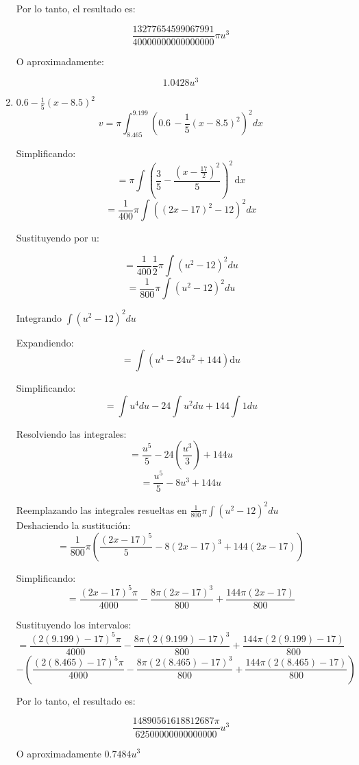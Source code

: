 \documentclass{article}
\begin{document}
\begin{enumerate}
    Por lo tanto, el resultado es:
    
    $$\dfrac{13277654599067991}{40000000000000000} \pi u^3 $$
    
    O aproximadamente:
    
    $$ 1.0428 u^3 $$
    
    
    \pagebreak

    
    \item $0.6 -\frac{1}{5} (x-8.5)^2$
    $$ v = \pi \int_{8.465}^{9.199} (0.6\, -\frac{1}{5} (x-8.5)^2)^2 dx $$
    
    Simplificando:
    $$ = \pi {\displaystyle\int}\left(\dfrac{3}{5}-\dfrac{\left(x-\frac{17}{2}\right)^2}{5}\right)^2\,\mathrm{d}x$$
    $$ = \frac{1}{400} \pi \int ((2x - 17)^2 - 12)^2 dx $$

    Sustituyendo por u:
    
    $$ = \frac{1}{400} \frac{1}{2} \pi \int (u^2 - 12)^2 du $$
    $$ = \frac{1}{800} \pi \int (u^2 - 12)^2 du $$
    
    Integrando $ \int (u^2 - 12)^2 du $
    
    Expandiendo:
    $$={\displaystyle\int}\left(u^4-24u^2+144\right)\mathrm{d}u$$
    
    Simplificando:
    $$ = \int u^4 du - 24 \int u^2 du + 144 \int 1 du $$
    
    Resolviendo las integrales:
    $$ = \frac{u^5}{5} - 24 (\frac{u^3}{3}) + 144u $$
    $$ = \frac{u^5}{5} - 8u^3 + 144u $$
    
    Reemplazando las integrales resueltas en $\frac{1}{800} \pi \int (u^2 - 12)^2 du $\\
    
    Deshaciendo la sustitución:
    $$ = \frac{1}{800} \pi (\frac{(2x-17)^5}{5} - 8(2x-17)^3 + 144(2x-17)) $$
    
    Simplificando:
    $$ = \frac{(2x-17)^5 \pi}{4000} - \frac{8\pi(2x-17)^3}{800} + \frac{144\pi(2x-17)}{800} $$
    
    Sustituyendo los intervalos:
    $$ = \frac{(2(9.199)-17)^5 \pi}{4000} - \frac{8\pi(2(9.199)-17)^3}{800} + \frac{144\pi(2(9.199)-17)}{800} $$
    $$ - (\frac{(2(8.465)-17)^5 \pi}{4000} - \frac{8\pi(2(8.465)-17)^3}{800} + \frac{144\pi(2(8.465)-17)}{800}) $$
    
    Por lo tanto, el resultado es:
    
    $$ \dfrac{14890561618812687{\pi}}{62500000000000000} u^3 $$
    
    O aproximadamente $0.7484 u^3$
    

\end{enumerate}
\end{document}

